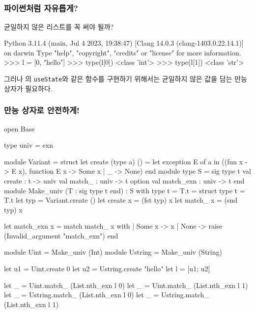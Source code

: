 \documentclass{beamer}
\begin{document}
\subsection{}
\begin{frame}[c, fragile]
  \frametitle{파이썬처럼 자유롭게?}

  균일하지 않은 리스트를 꼭 써야 될까?
  \begin{pycode}
Python 3.11.4 (main, Jul  4 2023, 19:38:47) [Clang 14.0.3 (clang-1403.0.22.14.1)] on darwin
Type "help", "copyright", "credits" or "license" for more information.
>>> l = [0, "hello"]
>>> type(l[0])
<class 'int'>
>>> type(l[1])
<class 'str'>
  \end{pycode}
  \pause 그러나 의 \verb/useState/와 같은 함수를 구현하기 위해서는 균일하지 않은 값을 담는 만능 상자가 필요하다.
\end{frame}

\begin{frame}[c, fragile]
  \frametitle{만능 상자로 안전하게!}
  \begin{minipage}[t]{0.50\linewidth}
  \begin{ocamlcode}
open Base

type univ = exn

module Variant = struct
  let create (type a) () =
    let exception E of a in
    ((fun x -> E x), function E x -> Some x | _ -> None)
end
module type S = sig
  type t
  val create : t -> univ
  val match_ : univ -> t option
  val match_exn : univ -> t
end
module Make_univ (T : sig
  type t
end) : S with type t = T.t = struct
  type t = T.t
  let typ = Variant.create ()
  let create x = (fst typ) x
  let match_ x = (snd typ) x
  \end{ocamlcode}
  \end{minipage}
  \begin{minipage}[t]{0.49\linewidth}
  \begin{ocamlcode}
  let match_exn x =
    match match_ x with
    | Some x -> x
    | None -> raise (Invalid_argument "match_exn")
end

module Uint = Make_univ (Int)
module Ustring = Make_univ (String)

let u1 = Uint.create 0
let u2 = Ustring.create "hello"
let l = [u1; u2]

let _ = Uint.match_ (List.nth_exn l 0)
let _ = Uint.match_ (List.nth_exn l 1)
let _ = Ustring.match_ (List.nth_exn l 0)
let _ = Ustring.match_ (List.nth_exn l 1)
  \end{ocamlcode}
  \end{minipage}
\end{frame}
\end{document}
